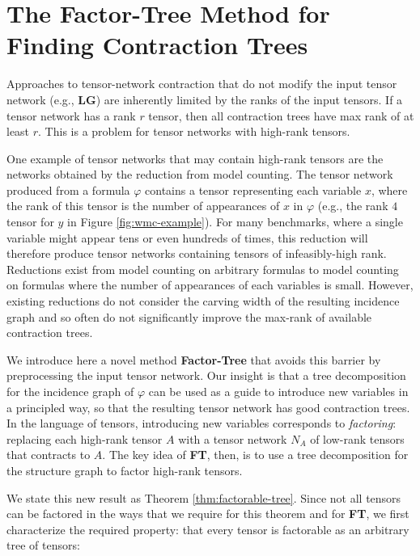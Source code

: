 \section{The Factor-Tree Method for Finding Contraction Trees}
\label{sec:preprocessing}
Approaches to tensor-network contraction that do not modify the input tensor network (e.g., \textbf{LG}) are inherently limited by the ranks of the input tensors. If a tensor network has a rank $r$ tensor, then all contraction trees have max rank of at least $r$. This is a problem for tensor networks with high-rank tensors. 

One example of tensor networks that may contain high-rank tensors are the networks obtained by the reduction from model counting. The tensor network produced from a formula $\varphi$ contains a tensor representing each variable $x$, where the rank of this tensor is the number of appearances of $x$ in $\varphi$ (e.g., the rank $4$ tensor for $y$ in Figure \ref{fig:wmc-example}). For many benchmarks, where a single variable might appear tens or even hundreds of times, this reduction will therefore produce tensor networks containing tensors of infeasibly-high rank. Reductions exist from model counting on arbitrary formulas to model counting on formulas where the number of appearances of each variables is small. However, existing reductions do not consider the carving width of the resulting incidence graph and so often do not significantly improve the max-rank of available contraction trees. 

We introduce here a novel method \textbf{Factor-Tree} that avoids this barrier by preprocessing the input tensor network. Our insight is that a tree decomposition for the incidence graph of $\varphi$ can be used as a guide to introduce new variables in a principled way, so that the resulting tensor network has good contraction trees. In the language of tensors, introducing new variables corresponds to \emph{factoring}: replacing each high-rank tensor $A$ with a tensor network $N_A$ of low-rank tensors that contracts to $A$. The key idea of \textbf{FT}, then, is to use a tree decomposition for the structure graph to factor high-rank tensors.

We state this new result as Theorem \ref{thm:factorable-tree}. Since not all tensors can be factored in the ways that we require for this theorem and for \textbf{FT}, we first characterize the required property: that every tensor is factorable as an arbitrary tree of tensors:


